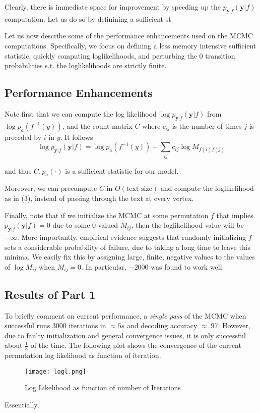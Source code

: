 \documentclass[aps,prd,final,twocolumn,letterpaper]{revtex4}
\begin{document}
Clearly, there is immediate space for improvement by speeding up the $p_{\mathbf{y}|f}(\mathbf{y}|f)$ computation. Let us do so by definining a sufficient st

Let us now describe some of the performance enhancements used on the MCMC computations. Specifically, we focus on defining a less memory intensive sufficient statistic, quickly computing loglikelihoods, and perturbing the 0 transition probabilities s.t. the loglikelihoods are strictly finite.

\subsection{Performance Enhancements}
Note first that we can compute the log likelihood $\log p_{\mathbf{y}|f}(\mathbf{y}|f)$ from $\log p_a(f^{-1}(y))$, and the count matrix $C$ where $c_{ij}$ is the number of times $j$ is preceded by $i$ in $y$. It follows 
\begin{equation}
\log p_{\mathbf{y}|f}(\mathbf{y}|f) = \log p_a(f^{-1}(y)) + \sum_{ij} c_{ij}\log M_{f(i)f(j)}
\end{equation}

\noindent and thus $C,p_a(\cdot)$ is a sufficient statistic for our model. 

Moreover, we can precompute $C$ in $O(\text{text size})$ and compute the loglikelihood as in (3), instead of passing through the text at every vertex. 

Finally, note that if we initialize the MCMC at some permutation $f$ that implies $p_{\mathbf{y}|f}(\mathbf{y}|f) = 0$ due to some 0 valued $M_{ij}$, then the loglikelihood value will be $-\infty$. More importantly, empirical evidence suggests that randomly initializing $f$ sets a considerable probability of failure, due to taking a long time to leave this minima. We easily fix this by assigning large, finite, negative values to the values of $\log M_{ij}$ when $M_{ij} = 0$. In particular, $-2000$ was found to work well.

\subsection{Results of Part 1}
To briefly comment on current performance, a \textit{single pass }of the MCMC when successful runs $3000$ iterations in $\approx 5s$ and decoding accuracy $\approx .97$. However, due to faulty initialization and general convergence issues, it is only successful about $\frac{1}{3}$ of the time. The following plot shows the convergence of the current permutation log likelihood as function of iteration.

\begin{figure}[h]
\centering
\texttt{[image: logl.png]}
\caption{Log Likelihood as function of number of Iterations}
\end{figure}

Essentially, 
\end{document}
